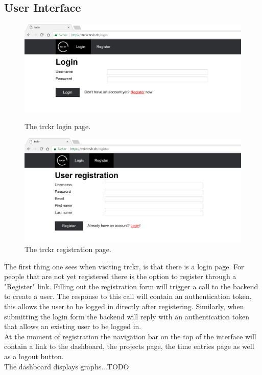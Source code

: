 \documentclass[a4paper, 12pt, headsepline]{scrartcl}
\begin{document}
\subsection{User Interface}

\begin{figure}[h]
    \includegraphics[width=\textwidth]{trckr-login}
    \caption{The trckr login page.}
    \label{fig:trckr-login}

    \includegraphics[width=\textwidth]{trckr-register}
    \caption{The trckr registration page.}
    \label{fig:trckr-register}
\end{figure}

The first thing one sees when visiting trckr, is that there is a login page.
For people that are not yet registered there is the option to register through a
"Register" link. Filling out the registration form will trigger a call to the
backend to create a user. The response to this call will contain an authentication
token, this allows the user to be logged in directly after registering.
Similarly, when submitting the login form the backend will reply with an
authentication token that allows an existing user to be logged in.\\
At the moment of registration the navigation bar on the top of the interface
will contain a link to the dashboard, the projects page, the time entries page
as well as a logout button.\\
The dashboard displays graphs...TODO \\
\end{document}
